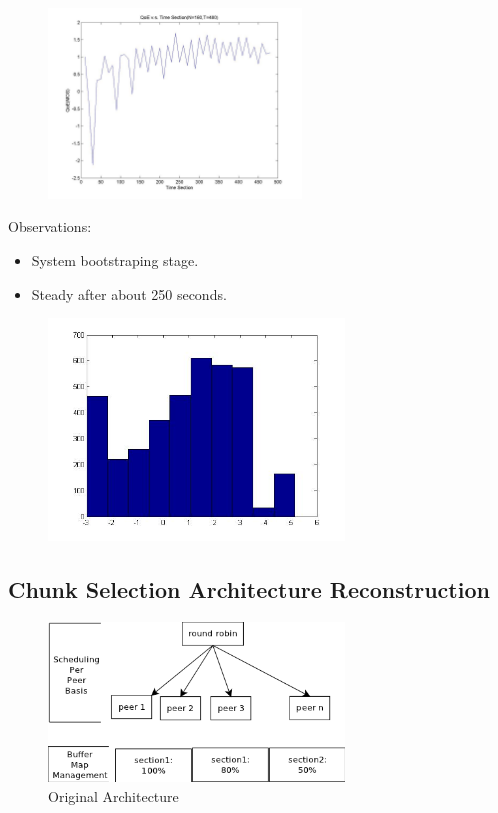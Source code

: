 \documentclass[11pt,a4paper]{article}
\begin{document}
\begin{figure}
	\includegraphics[width=0.6\textwidth]{../fig/time_qoe.jpg}
\end{figure}
Observations:
\begin{itemize}
	\item System bootstraping stage. 
	\item Steady after about 250 seconds. 
\end{itemize}

\begin{figure}
	\includegraphics[width=0.7\textwidth]{../fig/qoe_hist.jpg}
\end{figure}

\subsection{Chunk Selection Architecture Reconstruction}

\begin{figure}
	\includegraphics[width=0.7\textwidth]{../fig/arch_orig.png}
	\caption{Original Architecture}
\end{figure}
\end{document}
